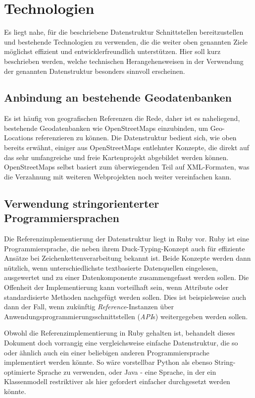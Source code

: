 \section{Technologien}
\label{technologies}
Es liegt nahe, für die beschriebene Datenstruktur Schnittstellen bereitzustellen und bestehende Technologien zu verwenden, die die weiter oben genannten Ziele möglichst effizient und entwicklerfreundlich unterstützen. Hier soll kurz beschrieben werden, welche technischen Herangehensweisen in der Verwendung der genannten Datenstruktur besonders sinnvoll erscheinen.

\subsection{Anbindung an bestehende Geodatenbanken}
Es ist häufig von geografischen Referenzen die Rede, daher ist es naheliegend, bestehende Geodatenbanken wie OpenStreetMaps einzubinden, um Geo-Locations referenzieren zu können. Die Datenstruktur bedient sich, wie oben bereits erwähnt, einiger aus OpenStreetMaps entlehnter Konzepte, die direkt auf das sehr umfangreiche und freie Kartenprojekt abgebildet werden können. OpenStreetMaps selbst basiert zum überwiegenden Teil auf XML-Formaten, was die Verzahnung mit weiteren Webprojekten noch weiter vereinfachen kann.

\subsection{Verwendung stringorienterter Programmiersprachen}
Die Referenzimplementierung der Datenstruktur liegt in Ruby vor\cite{georeferencegem}. Ruby ist eine Programmiersprache, die neben ihrem Duck-Typing-Konzept auch für effiziente Ansätze bei Zeichenkettenverarbeitung bekannt ist. Beide Konzepte werden dann nützlich, wenn unterschiedlichste textbasierte Datenquellen eingelesen, ausgewertet und zu einer Datenkomponente zusammengefasst werden sollen. Die Offenheit der Implementierung kann vorteilhaft sein, wenn Attribute oder standardisierte Methoden nachgefügt werden sollen. Dies ist beispielsweise auch dann der Fall, wenn zukünftig \textit{Reference}-Instanzen über Anwendungsprogrammierungsschnittstellen (\textit{API}s) weitergegeben werden sollen.

Obwohl die Referenzimplementierung in Ruby gehalten ist, behandelt dieses Dokument doch vorrangig eine vergleichsweise einfache Datenstruktur, die so oder ähnlich auch ein einer beliebigen anderen Programmiersprache implementiert werden könnte. So wäre vorstellbar Python als ebenso String-optimierte Sprache zu verwenden, oder Java - eine Sprache, in der ein Klassenmodell restriktiver als hier gefordert einfacher durchgesetzt werden könnte.

